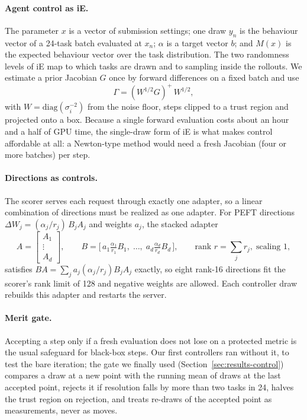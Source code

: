 \documentclass[11pt]{article}
\begin{document}
\paragraph{Agent control as iE.} The parameter $x$ is a vector of submission settings; one draw $y_n$ is the behaviour vector of a 24-task batch evaluated at $x_n$; $\alpha$ is a target vector $b$; and $M(x)$ is the expected behaviour vector over the task distribution. The two randomness levels of iE map to which tasks are drawn and to sampling inside the rollouts. We estimate a prior Jacobian $G$ once by forward differences on a fixed batch and use
\begin{equation}
\Gamma = (W^{1/2} G)^{+}\, W^{1/2},
\end{equation}
with $W = \mathrm{diag}(\sigma_i^{-2})$ from the noise floor, steps clipped to a trust region and projected onto a box. Because a single forward evaluation costs about an hour and a half of GPU time, the single-draw form of iE is what makes control affordable at all: a Newton-type method would need a fresh Jacobian (four or more batches) per step.

\paragraph{Directions as controls.} The scorer serves each request through exactly one adapter, so a linear combination of directions must be realized as one adapter. For PEFT directions $\Delta W_j = (\alpha_j/r_j)\,B_jA_j$ and weights $a_j$, the stacked adapter
\begin{equation}
A = \begin{bmatrix}A_1\\ \vdots\\ A_d\end{bmatrix},\qquad
B = \Big[\,a_1\tfrac{\alpha_1}{r_1}B_1,\;\dots,\;a_d\tfrac{\alpha_d}{r_d}B_d\,\Big],\qquad \text{rank } r = \textstyle\sum_j r_j,\; \text{scaling } 1,
\end{equation}
satisfies $BA = \sum_j a_j (\alpha_j/r_j) B_jA_j$ exactly, so eight rank-16 directions fit the scorer's rank limit of 128 and negative weights are allowed. Each controller draw rebuilds this adapter and restarts the server.

\paragraph{Merit gate.} Accepting a step only if a fresh evaluation does not lose on a protected metric is the usual safeguard for black-box steps. Our first controllers ran without it, to test the bare iteration; the gate we finally used (Section~\ref{sec:results-control}) compares a draw at a new point with the running mean of draws at the last accepted point, rejects it if resolution falls by more than two tasks in 24, halves the trust region on rejection, and treats re-draws of the accepted point as measurements, never as moves.
\end{document}
